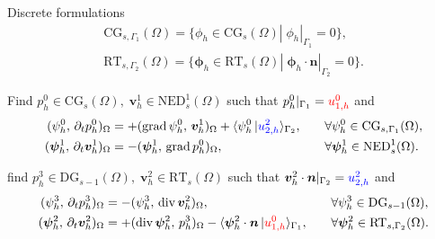 \documentclass[aspectratio=169]{beamer}
\DeclareMathOperator*{\grad}{grad}
\renewcommand{\div}{\operatorname{div}}
\newcommand{\inpr}[3][]{\ensuremath{( #2, \, #3 )_{#1}}}
\newcommand{\dualpr}[3][]{\ensuremath{\langle #2 \, \vert #3 \rangle_{#1}}}
\begin{document}
\begin{frame}{Discrete formulations}
	\begin{equation*}
		\begin{aligned}
		\mathrm{CG}_{s, \Gamma_1}(\Omega) = \{\phi_h \in \mathrm{CG}_{s}(\Omega) |\; \phi_h|_{\Gamma_1} = 0\}, \\
		\mathrm{RT}_{s, \Gamma_2}(\Omega) = \{\bm{\phi}_h \in \mathrm{RT}_{s}(\Omega) |\; \bm{\phi}_h \cdot \bm{n}|_{\Gamma_2} = 0\}.
		\end{aligned}
	\end{equation*}
	
		
		
		\begin{tcolorbox}[nobeforeafter, colframe=theme,title=Primal weak formulation]%
		Find $p^0_h \in \mathrm{CG}_{s}(\Omega), \; \bm{v}^1_h \in \mathrm{NED}^1_s(\Omega)$ such that $p^0_h|_{\Gamma_1} = \textcolor{red}{u^0_{1, h}}$ and
		\begin{equation*}
			\begin{aligned}
				\inpr[\Omega]{\psi^0_h}{\partial_t p^0_h} &= +\inpr[\Omega]{\grad \psi^0_h}{\bm{v}^1_h} + \dualpr[\Gamma_2]{\psi^0_h}{\textcolor{blue}{u^2_{2, h}}}, \\
				\inpr[\Omega]{\bm{\psi}^1_h}{\partial_t \bm{v}^1_h} &= -\inpr[\Omega]{\bm{\psi}^1_h}{\grad {p}^0_h},
			\end{aligned} \qquad
			\begin{aligned}
				&\forall \psi^0_h \in \mathrm{CG}_{s, \Gamma_1}(\Omega), \\
				&\forall \bm{\psi}^1_h \in \mathrm{NED}^1_{s}(\Omega).
			\end{aligned}
		\end{equation*}	
			
		\end{tcolorbox} 
	
		
	\begin{tcolorbox}[nobeforeafter, colframe=theme,title=Dual weak formulation]%
		find $p^3_h \in \mathrm{DG}_{s-1}(\Omega), \; \bm{v}^2_h \in \mathrm{RT}_{s}(\Omega)$ such that $\bm{v}^2_h \cdot \bm{n}|_{\Gamma_2} = \textcolor{blue}{u^2_{2, h}}$ and
		\begin{equation*}
			\begin{aligned}
				\inpr[\Omega]{\psi^3_h}{\partial_t p^3_h} &= -\inpr[\Omega]{\psi^3_h}{\div\bm{v}^2_h}, \\
				\inpr[\Omega]{\bm{\psi}^2_h}{\partial_t \bm{v}^2_h} &= +\inpr[\Omega]{\div \bm{\psi}^2_h}{{p}^3_h} - \dualpr[\Gamma_1]{\bm{\psi}^2_h \cdot \bm{n}}{\textcolor{red}{u^0_{1, h}}},
			\end{aligned} \qquad
			\begin{aligned}
				&\forall \psi^3_h \in \mathrm{DG}_{s-1}(\Omega), \\
				&\forall \bm{\psi}^2_h \in \mathrm{RT}_{s, \Gamma_2}(\Omega).
			\end{aligned}
		\end{equation*}
	\end{tcolorbox} 

	\end{frame}
\end{document}
